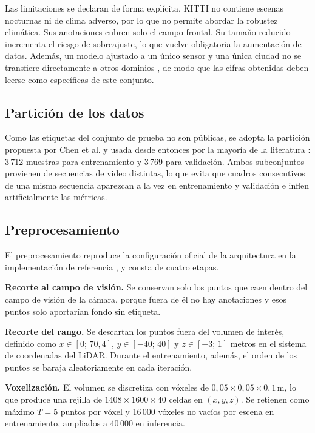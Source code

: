 \documentclass[11pt,letterpaper]{article}
\begin{document}
Las limitaciones se declaran de forma explícita. KITTI no contiene escenas nocturnas ni de clima adverso, por lo que no permite abordar la robustez climática. Sus anotaciones cubren solo el campo frontal. Su tamaño reducido incrementa el riesgo de sobreajuste, lo que vuelve obligatoria la aumentación de datos. Además, un modelo ajustado a un único sensor y una única ciudad no se transfiere directamente a otros dominios \cite{sohail2025}, de modo que las cifras obtenidas deben leerse como específicas de este conjunto.

\subsection{Partición de los datos}

Como las etiquetas del conjunto de prueba no son públicas, se adopta la partición propuesta por Chen et al. \cite{chen2015} y usada desde entonces por la mayoría de la literatura \cite{yan2018, shi2020, deng2021}: 3\,712 muestras para entrenamiento y 3\,769 para validación. Ambos subconjuntos provienen de secuencias de video distintas, lo que evita que cuadros consecutivos de una misma secuencia aparezcan a la vez en entrenamiento y validación e inflen artificialmente las métricas.

\subsection{Preprocesamiento}

El preprocesamiento reproduce la configuración oficial de la arquitectura \cite{yan2018} en la implementación de referencia \cite{openpcdet}, y consta de cuatro etapas.

\textbf{Recorte al campo de visión.} Se conservan solo los puntos que caen dentro del campo de visión de la cámara, porque fuera de él no hay anotaciones y esos puntos solo aportarían fondo sin etiqueta.

\textbf{Recorte del rango.} Se descartan los puntos fuera del volumen de interés, definido como $x \in [0;\, 70{,}4]$, $y \in [-40;\, 40]$ y $z \in [-3;\, 1]$ metros en el sistema de coordenadas del LiDAR. Durante el entrenamiento, además, el orden de los puntos se baraja aleatoriamente en cada iteración.

\textbf{Voxelización.} El volumen se discretiza con vóxeles de $0{,}05 \times 0{,}05 \times 0{,}1$\,m, lo que produce una rejilla de $1408 \times 1600 \times 40$ celdas en $(x, y, z)$. Se retienen como máximo $T = 5$ puntos por vóxel y 16\,000 vóxeles no vacíos por escena en entrenamiento, ampliados a 40\,000 en inferencia.
\end{document}
